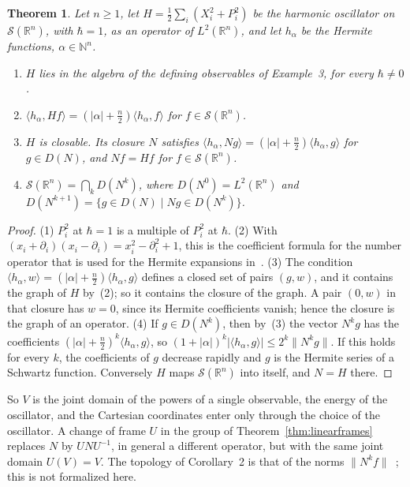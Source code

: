 \documentclass[11pt]{article}
\newtheorem{theorem}{Theorem}[section]
\theoremstyle{definition}
\begin{document}
\begin{theorem}\label{thm:oscillator}
  Let $n \ge 1$, let $H = \frac12 \sum_i (X_i^2 + P_i^2)$ be the harmonic oscillator on
  $\mathcal S(\mathbb R^n)$, with $\hbar = 1$, as an operator of $L^2(\mathbb R^n)$, and let
  $h_\alpha$ be the Hermite functions, $\alpha \in \mathbb N^n$.
  \begin{enumerate}
    \item $H$ lies in the algebra of the defining observables of Example~3, for every
      $\hbar \ne 0$.
    \item $\langle h_\alpha, Hf\rangle = (|\alpha| + \frac n2)\langle h_\alpha, f\rangle$ for
      $f \in \mathcal S(\mathbb R^n)$.
    \item $H$ is closable. Its closure $N$ satisfies
      $\langle h_\alpha, Ng\rangle = (|\alpha| + \frac n2)\langle h_\alpha, g\rangle$ for
      $g \in D(N)$, and $N f = H f$ for $f \in \mathcal S(\mathbb R^n)$.
    \item $\mathcal S(\mathbb R^n) = \bigcap_{k} D(N^k)$, where $D(N^0) = L^2(\mathbb R^n)$ and
      $D(N^{k+1}) = \{g \in D(N) \mid Ng \in D(N^k)\}$.
  \end{enumerate}
\end{theorem}

\begin{proof}
  (1) $P_i^2$ at $\hbar = 1$ is a multiple of $P_i^2$ at $\hbar$. (2) With
  $(x_i + \partial_i)(x_i - \partial_i) = x_i^2 - \partial_i^2 + 1$, this is the coefficient
  formula for the number operator that is used for the Hermite expansions in~.
  (3) The condition $\langle h_\alpha, w\rangle = (|\alpha| + \frac n2)\langle h_\alpha, g\rangle$
  defines a closed set of pairs $(g, w)$, and it contains the graph of $H$ by~(2); so it contains
  the closure of the graph. A pair $(0, w)$ in that closure has $w = 0$, since its Hermite
  coefficients vanish; hence the closure is the graph of an operator. (4) If $g \in D(N^k)$, then
  by~(3) the vector $N^k g$ has the coefficients $(|\alpha| + \frac n2)^k\langle h_\alpha,
  g\rangle$, so $(1 + |\alpha|)^k|\langle h_\alpha, g\rangle| \le 2^k\|N^k g\|$. If this holds
  for every $k$, the coefficients of $g$ decrease rapidly and $g$ is the Hermite series of a
  Schwartz function. Conversely $H$ maps $\mathcal S(\mathbb R^n)$ into itself, and $N = H$ there.
\end{proof}

So $V$ is the joint domain of the powers of a single observable, the energy of the oscillator,
and the Cartesian coordinates enter only through the choice of the oscillator. A change of frame
$U$ in the group of Theorem~\ref{thm:linearframes} replaces $N$ by $UNU^{-1}$, in general a
different operator, but with the same joint domain $U(V) = V$. The topology of Corollary~2 is
that of the norms $\|N^k f\|$~\cite{simon}; this is not formalized here.
\end{document}
